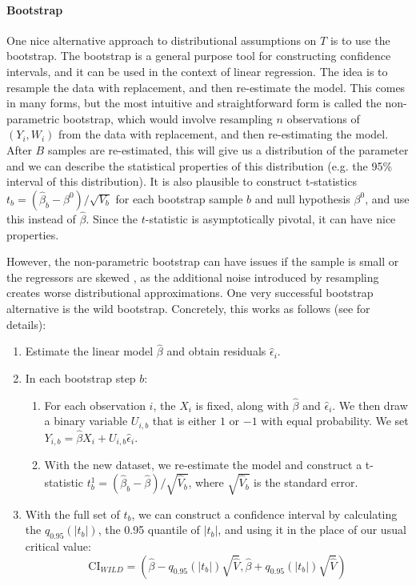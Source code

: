 \documentclass{tufte-handout}
\theoremstyle{break}
\begin{document}
\paragraph{Bootstrap}    One nice alternative approach to distributional assumptions on $T$ is to use the bootstrap. The bootstrap is a general purpose tool for constructing confidence intervals, and it can be used in the context of linear regression. The idea is to resample the data with replacement, and then re-estimate the model. This comes in many forms, but the most intuitive and straightforward form is called the non-parametric bootstrap, which would involve resampling $n$ observations of $(Y_{i}, W_{i})$ from the data with replacement, and then re-estimating the model. After $B$ samples are re-estimated, this will give us a distribution of the parameter and we can describe the statistical properties of this distribution (e.g. the 95\% interval of this distribution). It is also plausible to construct t-statistics $t_b = (\hat{\beta}_{b}-\beta^{0})/\sqrt{V_{b}}$ for each bootstrap sample $b$ and null hypothesis $\beta^{0}$, and use this instead of $\hat{\beta}$. Since the $t$-statistic is asymptotically pivotal, it can have nice properties. 

However, the non-parametric bootstrap can have issues if the sample is small or the regressors are skewed \citep{imbens2016robust}, as the additional noise introduced by resampling creates worse distributional approximations. One very successful bootstrap alternative is the wild bootstrap. Concretely, this works as follows (see \citet{DAVIDSON2008162} for details):
    \begin{enumerate}
      \item Estimate the linear model $\hat{\beta}$ and obtain residuals $\hat{\epsilon}_{i}$.
      \item In each bootstrap step $b$:
      \begin{enumerate}
        \item For each observation $i$, the $X_{i}$ is fixed, along with $\hat{\beta}$ and $\hat{\epsilon}_{i}$. We then draw a binary variable $U_{i,b}$ that is either $1$ or $-1$ with equal probability. We set $Y_{i,b} = \hat{\beta}X_{i} + U_{i,b}\hat{\epsilon}_{i}$.
        \item With the new dataset, we re-estimate the model and construct a t-statistic $t_{b}^{1} = (\hat{\beta}_{b}-\hat{\beta})/\sqrt{\hat{V}_{b}}$, where $\sqrt{\hat{V}_{b}}$ is the standard error.
      \end{enumerate}
      \item With the full set of $t_{b}$, we can construct a confidence interval by calculating the $q_{0.95}(|t_{b}|)$, the 0.95 quantile of $|t_{b}|$, and using it in the place of our usual critical value:
      \begin{equation*}
        \text{CI}_{WILD} = \left(\hat{\beta} - q_{0.95}(|t_{b}|)\sqrt{\hat{V}}, \hat{\beta} + q_{0.95}(|t_{b}|)\sqrt{\hat{V}}\right)
      \end{equation*}
    \end{enumerate}
\end{document}
